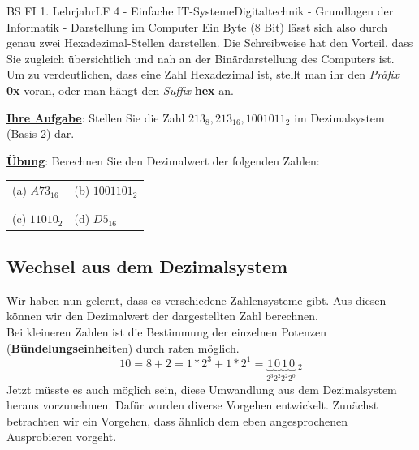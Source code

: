 \documentclass[11pt,twocolumn,oneside,openany,headings=optiontotoc,11pt,numbers=noenddot]{article}
\begin{document}
\begin{worksheet}{BS FI 1. Lehrjahr}{LF 4 - Einfache IT-Systeme}{Digitaltechnik - Grundlagen der Informatik - Darstellung im Computer}
		Ein Byte (8 Bit) lässt sich also durch genau zwei Hexadezimal-Stellen darstellen. Die Schreibweise hat den Vorteil, dass Sie zugleich übersichtlich und nah an der Binärdarstellung des Computers ist.\\
		Um zu verdeutlichen, dass eine Zahl Hexadezimal ist, stellt man ihr den \textit{Präfix} \textbf{0x} voran, oder man hängt den \textit{Suffix} \textbf{hex} an.\\
		\par\noindent
		\textbf{\underline{Ihre Aufgabe}}: Stellen Sie die Zahl \(213_{8}, 213_{16}, 1001011_{2}\) im Dezimalsystem (Basis 2) dar.\\
		\par\noindent
		\textbf{\underline{Übung}}: Berechnen Sie den Dezimalwert der folgenden Zahlen:\\
		\par\noindent
		\begin{tabularx}{0.45\textwidth}{M|M}
			(a) \(A73_{16}\) & (b) \(1001101_{2}\)\\
			& \\
			\hline
			& \\
			(c) \(11010_{2}\) & (d) \(D5_{16}\)\\
		\end{tabularx}
		\newpage
		\subsection{Wechsel aus dem Dezimalsystem}
		Wir haben nun gelernt, dass es verschiedene Zahlensysteme gibt. Aus diesen können wir den Dezimalwert der dargestellten Zahl berechnen.\\
		Bei kleineren Zahlen ist die Bestimmung der einzelnen Potenzen (\textbf{Bündelungseinheit}en) durch raten möglich.\\
		\[10 = 8 + 2 = 1*2^3 + 1*2^1 = \underbrace{1}_{2^3}\underbrace{0}_{2^2}\underbrace{1}_{2^2}\underbrace{0}_{2^0}\ _{2}\]
		Jetzt müsste es auch möglich sein, diese Umwandlung aus dem Dezimalsystem heraus vorzunehmen. Dafür wurden diverse Vorgehen entwickelt. Zunächst betrachten wir ein Vorgehen, dass ähnlich dem eben angesprochenen \grq{}Ausprobieren\grq{} vorgeht.\\

\end{worksheet}
\end{document}
